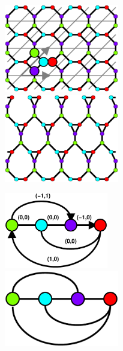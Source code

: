 \documentclass{beamer}
\begin{document}
\begin{frame}
  \begin{minipage}{2in}
     \begin{center}
         \includegraphics[height=1.5in]{periodic3a}\\
         \includegraphics[height=1.5in]{periodic1c}\\
     \end{center}
  \end{minipage}
  \begin{minipage}{1.8in}
     \begin{center}
       \includegraphics[height=1.3in]{periodic3b}\\
       \includegraphics[height=1.3in]{periodic1b}\\
     \end{center}
  \end{minipage}
\end{frame}
\end{document}
